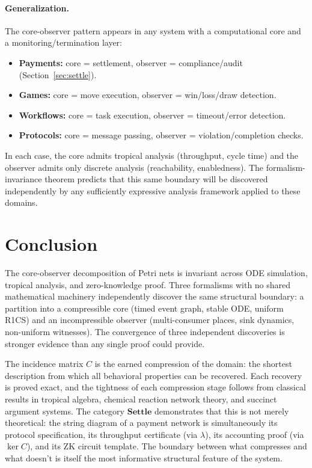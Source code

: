 \documentclass[11pt,a4paper]{article}
\newcommand{\Settle}{\mathbf{Settle}}
\begin{document}
\paragraph{Generalization.}
The core-observer pattern appears in any system with a computational core and a monitoring/termination layer:
\begin{itemize}
  \item \textbf{Payments:} core = settlement, observer = compliance/audit (Section~\ref{sec:settle}).
  \item \textbf{Games:} core = move execution, observer = win/loss/draw detection.
  \item \textbf{Workflows:} core = task execution, observer = timeout/error detection.
  \item \textbf{Protocols:} core = message passing, observer = violation/completion checks.
\end{itemize}

In each case, the core admits tropical analysis (throughput, cycle time) and the observer admits only discrete analysis (reachability, enabledness).
The formalism-invariance theorem predicts that this same boundary will be discovered independently by any sufficiently expressive analysis framework applied to these domains.

\section{Conclusion}
\label{sec:conclusion}

The core-observer decomposition of Petri nets is invariant across ODE simulation, tropical analysis, and zero-knowledge proof.
Three formalisms with no shared mathematical machinery independently discover the same structural boundary: a partition into a compressible core (timed event graph, stable ODE, uniform R1CS) and an incompressible observer (multi-consumer places, sink dynamics, non-uniform witnesses).
The convergence of three independent discoveries is stronger evidence than any single proof could provide.

The incidence matrix $C$ is the earned compression of the domain: the shortest description from which all behavioral properties can be recovered.
Each recovery is proved exact, and the tightness of each compression stage follows from classical results in tropical algebra, chemical reaction network theory, and succinct argument systems.
The category $\Settle$ demonstrates that this is not merely theoretical: the string diagram of a payment network is simultaneously its protocol specification, its throughput certificate (via $\lambda$), its accounting proof (via $\ker C$), and its ZK circuit template.
The boundary between what compresses and what doesn't is itself the most informative structural feature of the system.
\end{document}
